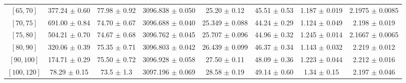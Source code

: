 \begin{tabular}{c||c|c|c|c|c|c|c}
$[65, 70]$ & 377.24 $\pm$ 0.60 & 77.98 $\pm$ 0.92 & 3096.838 $\pm$ 0.050 & 25.20 $\pm$ 0.12 & 45.51 $\pm$ 0.53 & 1.187 $\pm$ 0.019 & 2.1975 $\pm$ 0.0085\\
$[70, 75]$ & 691.00 $\pm$ 0.84 & 74.70 $\pm$ 0.67 & 3096.688 $\pm$ 0.040 & 25.349 $\pm$ 0.088 & 44.24 $\pm$ 0.29 & 1.124 $\pm$ 0.049 & 2.198 $\pm$ 0.019\\
$[75, 80]$ & 504.21 $\pm$ 0.70 & 74.67 $\pm$ 0.68 & 3096.762 $\pm$ 0.045 & 25.707 $\pm$ 0.096 & 44.96 $\pm$ 0.32 & 1.245 $\pm$ 0.014 & 2.1667 $\pm$ 0.0065\\
$[80, 90]$ & 320.06 $\pm$ 0.39 & 75.35 $\pm$ 0.71 & 3096.803 $\pm$ 0.042 & 26.439 $\pm$ 0.099 & 46.37 $\pm$ 0.34 & 1.143 $\pm$ 0.032 & 2.219 $\pm$ 0.012\\
$[90, 100]$ & 174.71 $\pm$ 0.29 & 75.50 $\pm$ 0.72 & 3096.928 $\pm$ 0.058 & 27.50 $\pm$ 0.11 & 48.09 $\pm$ 0.36 & 1.223 $\pm$ 0.044 & 2.212 $\pm$ 0.016\\
$[100, 120]$ & 78.29 $\pm$ 0.15 & 73.5 $\pm$ 1.3 & 3097.196 $\pm$ 0.069 & 28.58 $\pm$ 0.19 & 49.14 $\pm$ 0.60 & 1.34 $\pm$ 0.15 & 2.197 $\pm$ 0.046\\
\end{tabular}
